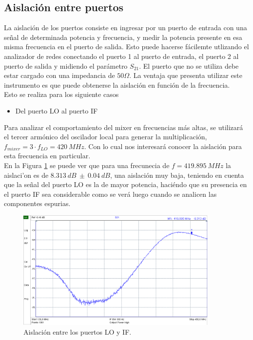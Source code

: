 \documentclass[a4paper,10pt]{article}
\begin{document}
	\subsection{Aislación entre puertos}
	\indent La aislaci\'on de los puertos consiste en ingresar por un puerto de 
	entrada con una se\~nal de determinada potencia y frecuencia, y medir la 
	potencia presente en esa misma frecuencia en el puerto de salida. Esto puede
	hacerse f\'acilemte utlizando el analizador de redes conectando el puerto 1 
	al puerto de entrada, el puerto 2 al puerto de salida y midiendo el 
	par\'ametro $S_{21}$. El puerto que no se utiliza debe estar cargado con una
	impedancia de $50\Omega$. La ventaja que presenta utilizar este instrumento 
	es que puede obtenerse la aislaci\'on en funci\'on de la frecuencia. \\
	\indent Esto se realiza para los siguiente casos
	
	\begin{itemize}
		\item Del puerto LO al puerto IF
	\end{itemize}
	
	\indent Para analizar el comportamiento del mixer en frecuencias m\'as 
	altas, se utilizar\'a el tercer arm\'onico del oscilador local para generar 
	la multiplicaci\'on, $f_{mixer}=3\cdot f_{LO}=420~MHz$. Con lo cual nos 
	interesar\'a conocer la aislaci\'on para esta frecuencia en particular. \\
	\indent En la Figura \ref{isolation1} se puede ver que para una frecunecia 
	de $f=419.895~MHz$ la aislaci'on es de $8.313~dB~\pm~0.04~dB$, una 
	aislaci\'on muy baja, teniendo en cuenta que la se\~nal del puerto LO es la 
	de mayor potencia, haci\'endo que su presencia en el puerto IF sea 
	considerable como se ver\'a luego cuando se analicen las componentes 
	espurias.
	
	\begin{figure}[!htb]
		\centering
		\includegraphics[width=10cm]{Images/aislacion1.png}
		\caption{Aislaci\'on entre los puertos LO y IF.}
		\label{isolation1}
	\end{figure}	
	
\end{document}
